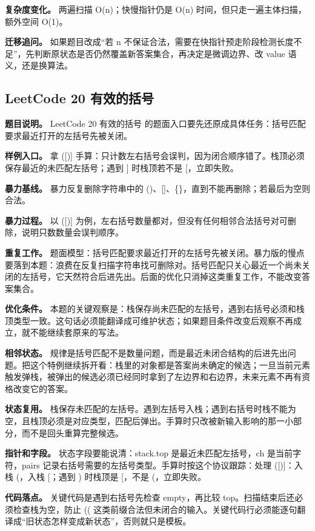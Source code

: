 \textbf{复杂度变化。} 两遍扫描 O(n)；快慢指针仍是 O(n) 时间，但只走一遍主体扫描，额外空间 O(1)。

\textbf{迁移追问。} 如果题目改成“若 n 不保证合法，需要在快指针预走阶段检测长度不足”，先判断原状态是否仍然覆盖新答案集合，再决定是微调边界、改 value 语义，还是换算法。

\subsection{LeetCode 20 有效的括号}

\textbf{题目说明。} LeetCode 20 有效的括号 的题面入口要先还原成具体任务：括号匹配要求最近打开的左括号先被关闭。

\textbf{样例入口。} 拿 ([)] 手算：只计数左右括号会误判，因为闭合顺序错了。栈顶必须保存最近的未匹配左括号；遇到 ] 时栈顶若不是 [，立即失败。

\textbf{暴力基线。} 暴力反复删除字符串中的 ()、[]、\{\}，直到不能再删除；若最后为空则合法。

\textbf{暴力过程。} 以 ([)] 为例，左右括号数量都对，但没有任何相邻合法括号对可删除，说明只数数量会误判顺序。

\textbf{重复工作。} 题面模型：括号匹配要求最近打开的左括号先被关闭。暴力版的慢点要落到本题：浪费在反复扫描字符串找可删除对。括号匹配只关心最近一个尚未关闭的左括号，它天然符合后进先出。后面的优化只消掉这类重复工作，不能改变答案集合。

\textbf{优化条件。} 本题的关键观察是：栈保存尚未匹配的左括号，遇到右括号必须和栈顶类型一致。这句话必须能翻译成可维护状态；如果题目条件改变后观察不再成立，就不能继续套原来的写法。

\textbf{相邻状态。} 规律是括号匹配不是数量问题，而是最近未闭合结构的后进先出问题。把这个特例继续拆开看：栈里的对象都是答案尚未确定的候选；一旦当前元素触发弹栈，被弹出的候选必须已经同时拿到了左边界和右边界，未来元素不再有资格改变它的答案。

\textbf{状态复用。} 栈保存未匹配的左括号。遇到左括号入栈；遇到右括号时栈不能为空，且栈顶必须是对应类型，匹配后弹出。手算时只改被新输入影响的那一小部分，而不是回头重算完整候选。

\textbf{指针和字段。} 状态字段要能说清：stack.top 是最近未匹配左括号，ch 是当前字符，pairs 记录右括号需要的左括号类型。手算时按这个协议跟踪：处理 ([)]：入栈 (，入栈 [；遇到 ) 时栈顶是 [，不是 (，立即失败。

\textbf{代码落点。} 关键代码是遇到右括号先检查 empty，再比较 top。扫描结束后还必须检查栈为空，防止 (( 这类前缀合法但未闭合的输入。关键代码行必须能逐句翻译成“旧状态怎样变成新状态”，否则就只是模板。

